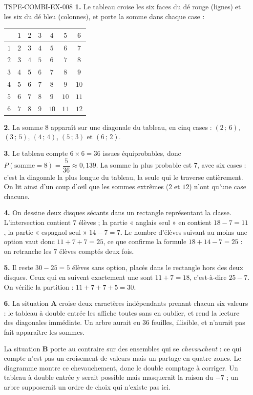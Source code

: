 \begin{corrige}{TSPE-COMBI-EX-008}
\textbf{1.} Le tableau croise les six faces du dé rouge (lignes) et les six du dé
bleu (colonnes), et porte la somme dans chaque case :

\begin{center}
\begin{tabular}{c|cccccc}
 & $1$ & $2$ & $3$ & $4$ & $5$ & $6$ \\
\hline
$1$ & $2$ & $3$ & $4$ & $5$ & $6$ & $7$ \\
$2$ & $3$ & $4$ & $5$ & $6$ & $7$ & $8$ \\
$3$ & $4$ & $5$ & $6$ & $7$ & $8$ & $9$ \\
$4$ & $5$ & $6$ & $7$ & $8$ & $9$ & $10$ \\
$5$ & $6$ & $7$ & $8$ & $9$ & $10$ & $11$ \\
$6$ & $7$ & $8$ & $9$ & $10$ & $11$ & $12$ \\
\end{tabular}
\end{center}

\textbf{2.} La somme $8$ apparaît sur une diagonale du tableau, en cinq cases :
$(2\,;\,6)$, $(3\,;\,5)$, $(4\,;\,4)$, $(5\,;\,3)$ et $(6\,;\,2)$.

\textbf{3.} Le tableau compte $6\times 6=36$ issues équiprobables, donc
$P(\text{somme}=8)=\dfrac{5}{36}\approx 0{,}139$. La somme la plus probable est
$7$, avec six cases : c'est la diagonale la plus longue du tableau, la seule qui
le traverse entièrement. On lit ainsi d'un coup d'\oe{}il que les sommes
extrêmes ($2$ et $12$) n'ont qu'une case chacune.

\textbf{4.} On dessine deux disques sécants dans un rectangle représentant la
classe. L'intersection contient $7$ élèves ; la partie « anglais seul » en
contient $18-7=11$, la partie « espagnol seul » $14-7=7$. Le nombre d'élèves
suivant au moins une option vaut donc $11+7+7=25$, ce que confirme la formule
$18+14-7=25$ : on retranche les $7$ élèves comptés deux fois.

\textbf{5.} Il reste $30-25=5$ élèves sans option, placés dans le rectangle hors
des deux disques. Ceux qui en suivent exactement une sont $11+7=18$, c'est-à-dire
$25-7$. On vérifie la partition : $11+7+7+5=30$.

\textbf{6.} La situation \textbf{A} croise deux caractères indépendants prenant
chacun six valeurs : le tableau à double entrée les affiche toutes sans en
oublier, et rend la lecture des diagonales immédiate. Un arbre aurait eu $36$
feuilles, illisible, et n'aurait pas fait apparaître les sommes.

La situation \textbf{B} porte au contraire sur des ensembles qui se
\emph{chevauchent} : ce qui compte n'est pas un croisement de valeurs mais un
partage en quatre zones. Le diagramme montre ce chevauchement, donc le
double comptage à corriger. Un tableau à double entrée y serait possible mais
masquerait la raison du $-7$ ; un arbre supposerait un ordre de choix qui n'existe
pas ici.
\end{corrige}
